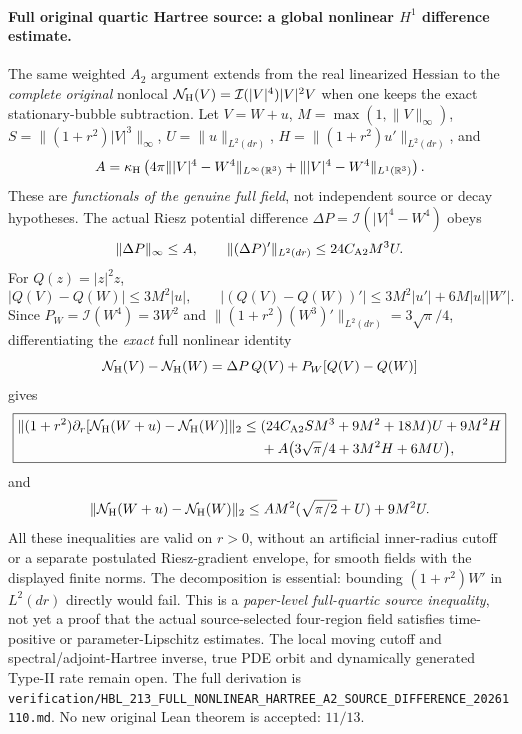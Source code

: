 \documentclass[11pt]{amsart}
\begin{document}
\paragraph{Full original quartic Hartree source: a global nonlinear \(H^1\) difference estimate.}
The same weighted \(A_2\) argument extends from the real
linearized Hessian to the \emph{complete original} nonlocal
\(\mathcal N_{\rm H}(V)=\mathcal I(|V|^4)|V|^2V\)
when one keeps the exact stationary-bubble subtraction.
Let \(V=W+u\), \(M=\max(1,\|V\|_\infty)\),
\(S=\|(1+r^2)|V|^3\|_\infty\),
\(U=\|u\|_{L^2(dr)}\),
\(H=\|(1+r^2)u'\|_{L^2(dr)}\), and
\[
 A=\kappa_{\rm H}\left(
 4\pi\||V|^4-W^4\|_{L^\infty(\mathbb R^3)}
 +\||V|^4-W^4\|_{L^1(\mathbb R^3)}\right).
\]
These are \emph{functionals of the genuine full field},
not independent source or decay hypotheses.
The actual Riesz potential difference
\(\Delta P=\mathcal I(|V|^4-W^4)\) obeys
\[
 \|\Delta P\|_\infty\le A,\qquad
 \|(\Delta P)'\|_{L^2(dr)}
   \le24 C_{\rm A2}M^3U .
\]
For \(Q(z)=|z|^2z\),
\[
 |Q(V)-Q(W)|\le3M^2|u|,\qquad
 |(Q(V)-Q(W))'|
 \le3M^2|u'|+6M|u||W'|.
\]
Since \(P_W=\mathcal I(W^4)=3W^2\) and
\(\|(1+r^2)(W^3)'\|_{L^2(dr)}=3\sqrt\pi/4\),
differentiating the \emph{exact} full nonlinear identity
\[
 \mathcal N_{\rm H}(V)-\mathcal N_{\rm H}(W)
  =\Delta P\,Q(V)+P_W[Q(V)-Q(W)]
\]
gives
\[
 \boxed{\begin{aligned}
 \|(1+r^2)\partial_r[
   \mathcal N_{\rm H}(W+u)-\mathcal N_{\rm H}(W)]\|_2
 \le{}&
  (24C_{\rm A2}SM^3+9M^2+18M)U+9M^2H\\
 &+A\bigl(3\sqrt\pi/4+3M^2H+6MU\bigr),
 \end{aligned}}
\]
and
\[
 \|\mathcal N_{\rm H}(W+u)-\mathcal N_{\rm H}(W)\|_2
 \le A M^2(\sqrt{\pi/2}+U)+9M^2U .
\]
All these inequalities are valid on \(r>0\), without
an artificial inner-radius cutoff or a separate
postulated Riesz-gradient envelope, for smooth fields
with the displayed finite norms.
The decomposition is essential: bounding
\((1+r^2)W'\) in \(L^2(dr)\) directly would fail.
This is a \emph{paper-level full-quartic source
inequality}, not yet a proof that the actual
source-selected four-region field satisfies
time-positive or parameter-Lipschitz estimates.
The local moving cutoff and
spectral/adjoint-Hartree inverse, true PDE orbit
and dynamically generated Type-II rate remain open.
The full derivation is
\texttt{verification/HBL\_213\_FULL\_NONLINEAR\_HARTREE\_A2\_SOURCE\_DIFFERENCE\_20261110.md}.
No new original Lean theorem is accepted: \(11/13\).
\end{document}
